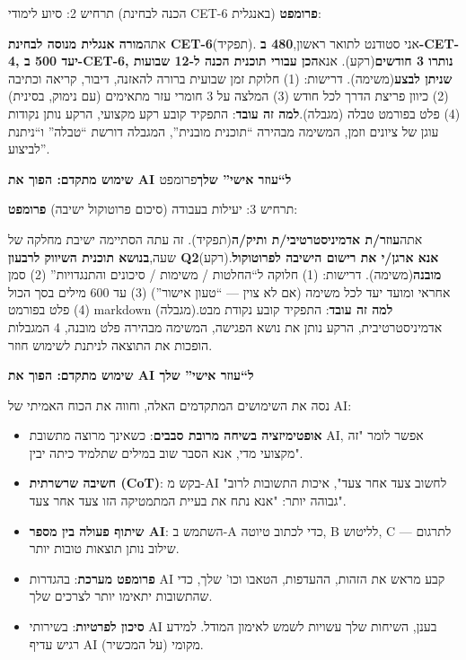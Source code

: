 \begin{tcbinfo}{תרחיש 2: סיוע לימודי (הכנה לבחינת CET-6 באנגלית)}
\textbf{פרומפט}:

אתה\textbf{מורה אנגלית מנוסה לבחינת CET-6}(תפקיד). אני סטודנט לתואר ראשון,\textbf{480 ב-CET-4, יעד 500 ב-CET-6, נותרו 3 חודשים}(רקע). אנא\textbf{הכן עבורי תוכנית הכנה ל-12 שבועות שניתן לבצע}(משימה). דרישות: (1) חלוקת זמן שבועית ברורה להאזנה, דיבור, קריאה וכתיבה (2) כיוון פריצת הדרך לכל חודש (3) המלצה על 3 חומרי עזר מתאימים (עם נימוק, בסינית) (4) פלט בפורמט טבלה (מגבלה).\textbf{למה זה עובד}: התפקיד קובע רקע מקצועי, הרקע נותן נקודות עוגן של ציונים וזמן, המשימה מבהירה “תוכנית מובנית”, המגבלה דורשת “טבלה” ו“ניתנת לביצוע”.

\textbf{שימוש מתקדם: הפוך את AI ל“עוזר אישי” שלך}פרומפט

\end{tcbinfo}

\begin{tcbinfo}{תרחיש 3: יעילות בעבודה (סיכום פרוטוקול ישיבה)}
\textbf{פרומפט}:

אתה\textbf{עוזר/ת אדמיניסטרטיבי/ת ותיק/ה}(תפקיד). זה עתה הסתיימה ישיבת מחלקה של שעה,\textbf{בנושא תוכנית השיווק לרבעון Q2}(רקע).\textbf{אנא ארגן/י את רישום הישיבה לפרוטוקול מובנה}(משימה). דרישות: (1) חלוקה ל“החלטות / משימות / סיכונים והתנגדויות” (2) סמן אחראי ומועד יעד לכל משימה (אם לא צוין — “טעון אישור”) (3) עד 600 מילים בסך הכול (4) פלט בפורמט markdown (מגבלה).\textbf{למה זה עובד}: התפקיד קובע נקודת מבט אדמיניסטרטיבית, הרקע נותן את נושא הפגישה, המשימה מבהירה פלט מובנה, 4 המגבלות הופכות את התוצאה לניתנת לשימוש חוזר.

\end{tcbinfo}

\textbf{שימוש מתקדם: הפוך את AI ל“עוזר אישי” שלך}\par

נסה את השימושים המתקדמים האלה, וחווה את הכוח האמיתי של AI:

\begin{itemize}
  \item \textbf{אופטימיזציה בשיחה מרובת סבבים}: כשאינך מרוצה מתשובת AI, אפשר לומר "זה מקצועי מדי, אנא הסבר שוב במילים שתלמיד כיתה יבין".
  \item \textbf{חשיבה שרשרתית (CoT)}: בקש מ-AI "לחשוב צעד אחר צעד", איכות התשובות לרוב גבוהה יותר: "אנא נתח את בעיית המתמטיקה הזו צעד אחר צעד".
  \item \textbf{שיתוף פעולה בין מספר AI}: השתמש ב-A כדי לכתוב טיוטה, B לליטוש, C לתרגום — שילוב נותן תוצאות טובות יותר.
  \item \textbf{פרומפט מערכת}: בהגדרות AI קבע מראש את הזהות, ההעדפות, הטאבו וכו' שלך, כדי שהתשובות יתאימו יותר לצרכים שלך.
  \item \textbf{סיכון לפרטיות}: בשירותי AI בענן, השיחות שלך עשויות לשמש לאימון המודל. למידע רגיש עדיף AI מקומי (על המכשיר).
\end{itemize}

